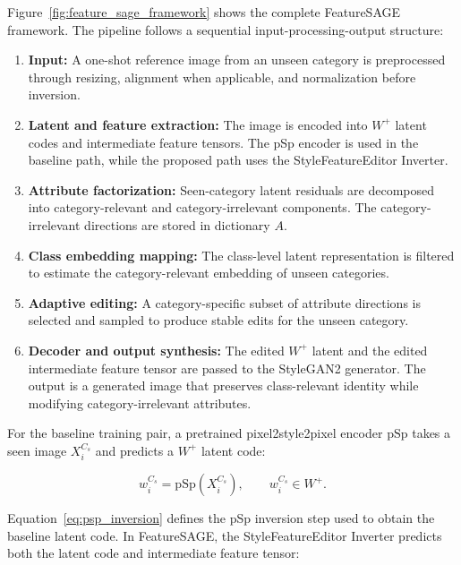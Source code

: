 \restoregeometry

Figure~\ref{fig:feature_sage_framework} shows the complete FeatureSAGE framework. The pipeline follows a sequential input-processing-output structure:

\begin{enumerate}
    \item \textbf{Input:} A one-shot reference image from an unseen category is preprocessed through resizing, alignment when applicable, and normalization before inversion.
    \item \textbf{Latent and feature extraction:} The image is encoded into $W^{+}$ latent codes and intermediate feature tensors. The pSp encoder is used in the baseline path, while the proposed path uses the StyleFeatureEditor Inverter.
    \item \textbf{Attribute factorization:} Seen-category latent residuals are decomposed into category-relevant and category-irrelevant components. The category-irrelevant directions are stored in dictionary $A$.
    \item \textbf{Class embedding mapping:} The class-level latent representation is filtered to estimate the category-relevant embedding of unseen categories.
    \item \textbf{Adaptive editing:} A category-specific subset of attribute directions is selected and sampled to produce stable edits for the unseen category.
    \item \textbf{Decoder and output synthesis:} The edited $W^{+}$ latent and the edited intermediate feature tensor are passed to the StyleGAN2 generator. The output is a generated image that preserves class-relevant identity while modifying category-irrelevant attributes.
\end{enumerate}

For the baseline training pair, a pretrained pixel2style2pixel encoder $\mathrm{pSp}$ takes a seen image $X_i^{C_s}$ and predicts a $W^{+}$ latent code:

\begin{equation}
    w_i^{C_s} = \mathrm{pSp}(X_i^{C_s}), \qquad w_i^{C_s} \in W^{+}.
    \label{eq:psp_inversion}
\end{equation}

Equation~\eqref{eq:psp_inversion} defines the pSp inversion step used to obtain the baseline latent code. In FeatureSAGE, the StyleFeatureEditor Inverter predicts both the latent code and intermediate feature tensor:

